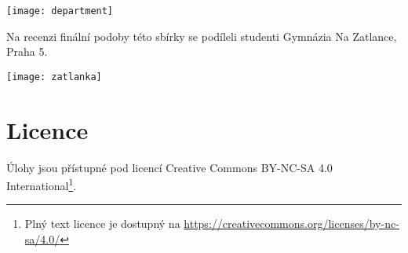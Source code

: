 \documentclass{book}
\begin{document}
\begin{center}
\texttt{[image: department]}    
\end{center}

Na recenzi finální podoby této sbírky se podíleli studenti Gymnázia Na Zatlance, Praha 5.
\begin{center}
\texttt{[image: zatlanka]}    
\end{center}


\section*{Licence}
Úlohy jsou přístupné pod licencí Creative Commons BY-NC-SA 4.0 International\footnote{Plný text licence je dostupný na \url{https://creativecommons.org/licenses/by-nc-sa/4.0/}}.
\end{document}
